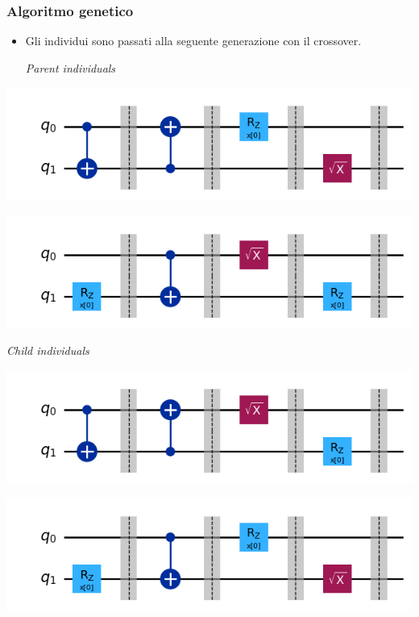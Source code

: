 \documentclass{beamer}
\begin{document}
\begin{frame}
  \frametitle{Algoritmo genetico}
  \begin{itemize}
    \item Gli individui sono passati alla seguente generazione con il crossover.
    \vspace{0.5cm}

  \centering \textit{Parent individuals}    \,\,\,\,\,\,\,
  \end{itemize}
  \begin{minipage}{0.5\textwidth}
    \centering
    \includegraphics[width=\textwidth]{images/parent1.png}
\end{minipage}%
\begin{minipage}{0.5\textwidth}
    \centering
    \includegraphics[width=\textwidth]{images/parent2.png}
\end{minipage}

\vspace{0.5cm}
\centering \textit{Child individuals}
\begin{minipage}{0.5\textwidth}
    \centering
    \includegraphics[width=\textwidth]{images/child1.png}
\end{minipage}%
\begin{minipage}{0.5\textwidth}
    \centering
    \includegraphics[width=\textwidth]{images/child2.png}
\end{minipage}

\end{frame}
\end{document}
